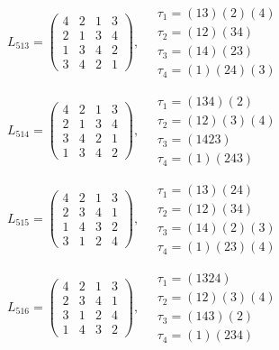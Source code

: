 $L_{513} = \begin{pmatrix} 4 & 2 & 1 & 3 \\ 2 & 1 & 3 & 4 \\ 1 & 3 & 4 & 2 \\ 3 & 4 & 2 & 1 \end{pmatrix}, \quad \begin{matrix} \tau_{1} = (1 3)(2)(4) \\ \tau_{2} = (1 2)(3 4) \\ \tau_{3} = (1 4)(2 3) \\ \tau_{4} = (1)(2 4)(3) \end{matrix}$

$L_{514} = \begin{pmatrix} 4 & 2 & 1 & 3 \\ 2 & 1 & 3 & 4 \\ 3 & 4 & 2 & 1 \\ 1 & 3 & 4 & 2 \end{pmatrix}, \quad \begin{matrix} \tau_{1} = (1 3 4)(2) \\ \tau_{2} = (1 2)(3)(4) \\ \tau_{3} = (1 4 2 3) \\ \tau_{4} = (1)(2 4 3) \end{matrix}$

$L_{515} = \begin{pmatrix} 4 & 2 & 1 & 3 \\ 2 & 3 & 4 & 1 \\ 1 & 4 & 3 & 2 \\ 3 & 1 & 2 & 4 \end{pmatrix}, \quad \begin{matrix} \tau_{1} = (1 3)(2 4) \\ \tau_{2} = (1 2)(3 4) \\ \tau_{3} = (1 4)(2)(3) \\ \tau_{4} = (1)(2 3)(4) \end{matrix}$

$L_{516} = \begin{pmatrix} 4 & 2 & 1 & 3 \\ 2 & 3 & 4 & 1 \\ 3 & 1 & 2 & 4 \\ 1 & 4 & 3 & 2 \end{pmatrix}, \quad \begin{matrix} \tau_{1} = (1 3 2 4) \\ \tau_{2} = (1 2)(3)(4) \\ \tau_{3} = (1 4 3)(2) \\ \tau_{4} = (1)(2 3 4) \end{matrix}$


